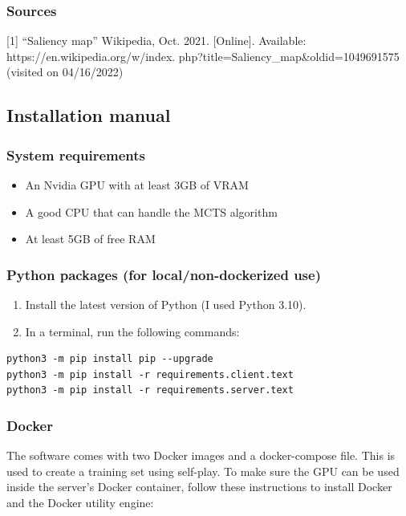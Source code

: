 \documentclass{article}
\begin{document}
\subsubsection{Sources}

[1] ``Saliency map'' Wikipedia, Oct. 2021. [Online]. Available: https://en.wikipedia.org/w/index.
php?title=Saliency\_map\&oldid=1049691575 (visited on 04/16/2022)

\newpage
\subsection{Installation manual}

\subsubsection{System requirements}

\begin{itemize}
	\item An Nvidia GPU with at least 3GB of VRAM
	\item A good CPU that can handle the MCTS algorithm
	\item At least 5GB of free RAM
\end{itemize}

\subsubsection{Python packages (for local/non-dockerized use)}

\begin{enumerate}
	\item Install the latest version of Python (I used Python 3.10). 
	\item In a terminal, run the following commands:
\end{enumerate}

\begin{verbatim}
python3 -m pip install pip --upgrade
python3 -m pip install -r requirements.client.text
python3 -m pip install -r requirements.server.text
\end{verbatim}

\subsubsection{Docker}

The software comes with two Docker images and a docker-compose file.
This is used to create a training set using self-play. 
To make sure the GPU can be used inside the server's Docker container,
follow these instructions to install Docker and the Docker utility engine:
\end{document}
